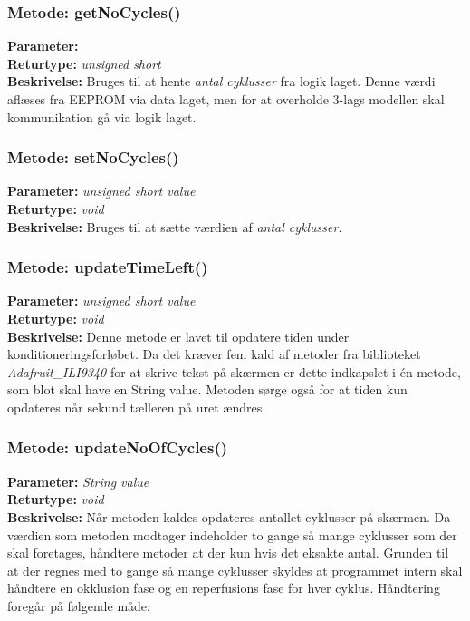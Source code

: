 \subsubsection{Metode: getNoCycles()}
\textbf{Parameter: } 
\\ \textbf{Returtype: } \textit{unsigned short}
\\ \textbf{Beskrivelse: } Bruges til at hente \textit{antal cyklusser} fra logik laget. Denne værdi aflæses fra EEPROM via data laget, men for at overholde 3-lags modellen skal kommunikation gå via logik laget. 

\subsubsection{Metode: setNoCycles()}
\textbf{Parameter: } \textit{unsigned short value}
\\ \textbf{Returtype: } \textit{void}
\\ \textbf{Beskrivelse: } Bruges til at sætte værdien af \textit{antal cyklusser}. 

\subsubsection{Metode: updateTimeLeft()}
\textbf{Parameter: } \textit{unsigned short value}
\\ \textbf{Returtype: } \textit{void}
\\ \textbf{Beskrivelse: } Denne metode er lavet til opdatere tiden under konditioneringsforløbet. Da det kræver fem kald af metoder fra biblioteket \textit{Adafruit\_ILI9340} for at skrive tekst på skærmen er dette indkapslet i én metode, som blot skal have en String value. Metoden sørge også for at tiden kun opdateres når sekund tælleren på uret ændres

\subsubsection{Metode: updateNoOfCycles()}
\textbf{Parameter: } \textit{String value}
\\ \textbf{Returtype: } \textit{void}
\\ \textbf{Beskrivelse: } Når metoden kaldes opdateres antallet cyklusser på skærmen. Da værdien som metoden modtager indeholder to gange så mange cyklusser som der skal foretages, håndtere metoder at der kun hvis det eksakte antal. Grunden til at der regnes med to gange så mange cyklusser skyldes at programmet intern skal håndtere en okklusion fase og en reperfusions fase for hver cyklus. Håndtering foregår på følgende måde: 

